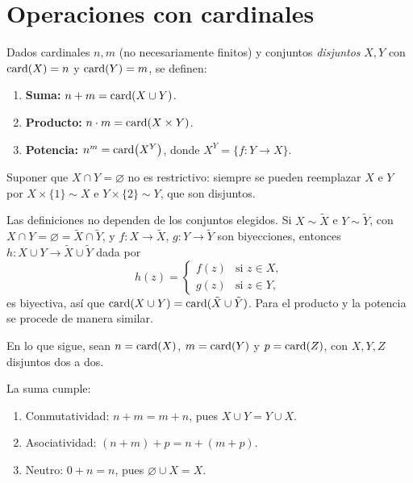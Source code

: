 \section{Operaciones con cardinales}

Dados cardinales \(n, m\) (no necesariamente finitos) y conjuntos \emph{disjuntos} \(X, Y\) con \(\operatorname{card}(X) = n\) y \(\operatorname{card}(Y) = m\), se definen:
\begin{enumerate}[label=(\arabic*)]
  \item \textbf{Suma:} \(n + m = \operatorname{card}(X \cup Y)\).
  \item \textbf{Producto:} \(n \cdot m = \operatorname{card}(X \times Y)\).
  \item \textbf{Potencia:} \(n^m = \operatorname{card}\bigl(X^Y\bigr)\), donde \(X^Y = \{ f\colon Y \to X \}\).
\end{enumerate}

\begin{note}
  Suponer que \(X \cap Y = \varnothing\) no es restrictivo: siempre se pueden reemplazar \(X\) e \(Y\) por \(X \times \{1\} \sim X\) e \(Y \times \{2\} \sim Y\), que son disjuntos.
\end{note}

\begin{note}
  Las definiciones no dependen de los conjuntos elegidos. Si \(X \sim \tilde{X}\) e \(Y \sim \tilde{Y}\), con \(X \cap Y = \varnothing = \tilde{X} \cap \tilde{Y}\), y \(f\colon X \to \tilde{X}\), \(g\colon Y \to \tilde{Y}\) son biyecciones, entonces \(h\colon X \cup Y \to \tilde{X} \cup \tilde{Y}\) dada por
  \[
    h(z) =
    \begin{cases}
      f(z) & \text{si } z \in X, \\
      g(z) & \text{si } z \in Y,
    \end{cases}
  \]
  es biyectiva, así que \(\operatorname{card}(X \cup Y) = \operatorname{card}(\tilde{X} \cup \tilde{Y})\). Para el producto y la potencia se procede de manera similar.
\end{note}

En lo que sigue, sean \(n = \operatorname{card}(X)\), \(m = \operatorname{card}(Y)\) y \(p = \operatorname{card}(Z)\), con \(X, Y, Z\) disjuntos dos a dos.

\begin{prop}
  La suma cumple:
  \begin{enumerate}[label=(\arabic*)]
    \item Conmutatividad: \(n + m = m + n\), pues \(X \cup Y = Y \cup X\).
    \item Asociatividad: \((n + m) + p = n + (m + p)\).
    \item Neutro: \(0 + n = n\), pues \(\varnothing \cup X = X\).
  \end{enumerate}
\end{prop}

